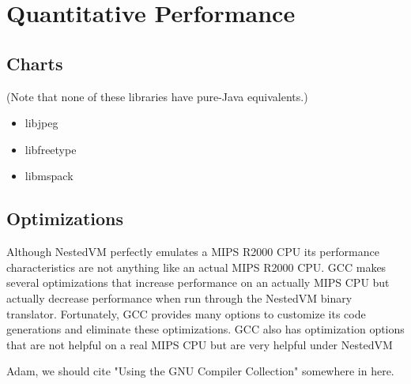 \documentclass{acmconf}
\begin{document}
\section{Quantitative Performance}

\subsection{Charts}

(Note that none of these libraries have pure-Java equivalents.)

\begin{itemize}
\item libjpeg
\item libfreetype
\item libmspack
\end{itemize}


\subsection{Optimizations}

Although NestedVM perfectly emulates a MIPS R2000 CPU its performance
characteristics are not anything like an actual MIPS R2000 CPU. GCC makes
several optimizations that increase performance on an actually MIPS CPU but
actually decrease performance when run through the NestedVM binary
translator. Fortunately, GCC provides many options to customize its code
generations and eliminate these optimizations. GCC also has optimization
options that are not helpful on a real MIPS CPU but are very helpful under
NestedVM

Adam, we should cite "Using the GNU Compiler Collection" somewhere in here.
\end{document}

